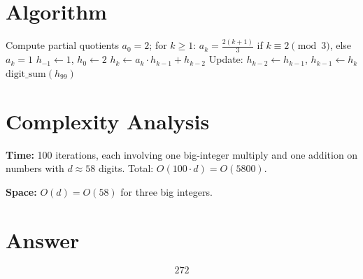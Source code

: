 \documentclass[12pt,a4paper]{article}
\begin{document}
\section{Algorithm}

\begin{algorithm}[H]
\caption{Compute digit sum of the numerator of the 100th convergent of $e$}
\begin{algorithmic}[1]
\STATE Compute partial quotients $a_0 = 2$; for $k \ge 1$: $a_k = \frac{2(k+1)}{3}$ if $k \equiv 2 \pmod 3$, else $a_k = 1$
\STATE $h_{-1} \gets 1$, $h_0 \gets 2$
    \STATE $h_k \gets a_k \cdot h_{k-1} + h_{k-2}$
    \STATE Update: $h_{k-2} \gets h_{k-1}$, $h_{k-1} \gets h_k$
\ENDFOR
\RETURN $\mathrm{digit\_sum}(h_{99})$
\end{algorithmic}
\end{algorithm}

\section{Complexity Analysis}

\textbf{Time:} 100 iterations, each involving one big-integer multiply and one addition on numbers with $d \approx 58$ digits. Total: $O(100 \cdot d) = O(5800)$.

\textbf{Space:} $O(d) = O(58)$ for three big integers.

\section{Answer}

\[
\boxed{272}
\]
\end{document}
